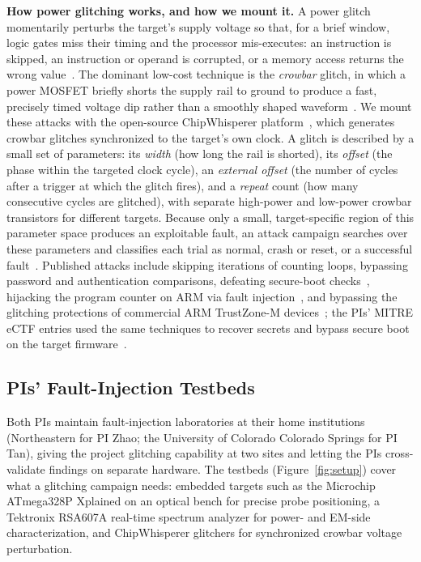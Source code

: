 \noindent\textbf{How power glitching works, and how we mount it.}
A power glitch momentarily perturbs the target's supply voltage so that, for a brief window, logic gates miss their timing and the processor mis-executes: an instruction is skipped, an instruction or operand is corrupted, or a memory access returns the wrong value~\cite{oflynn2016crowbar}.
The dominant low-cost technique is the \emph{crowbar} glitch, in which a power MOSFET briefly shorts the supply rail to ground to produce a fast, precisely timed voltage dip rather than a smoothly shaped waveform~\cite{oflynn2016crowbar}.
We mount these attacks with the open-source ChipWhisperer platform~\cite{chipwhisperer, chipwhispererdocs}, which generates crowbar glitches synchronized to the target's own clock.
A glitch is described by a small set of parameters: its \emph{width} (how long the rail is shorted), its \emph{offset} (the phase within the targeted clock cycle), an \emph{external offset} (the number of cycles after a trigger at which the glitch fires), and a \emph{repeat} count (how many consecutive cycles are glitched), with separate high-power and low-power crowbar transistors for different targets.
Because only a small, target-specific region of this parameter space produces an exploitable fault, an attack campaign searches over these parameters and classifies each trial as normal, crash or reset, or a successful fault~\cite{chipwhispererdocs, carpi2014glitch}.
Published attacks include skipping iterations of counting loops, bypassing password and authentication comparisons, defeating secure-boot checks~\cite{timmers2016bypassing}, hijacking the program counter on ARM via fault injection~\cite{timmers2016controlling}, and bypassing the glitching protections of commercial ARM TrustZone-M devices~\cite{sass2023multi}; the PIs' MITRE eCTF entries used the same techniques to recover secrets and bypass secure boot on the target firmware~\cite{ma2025ectf, ma2026wejust}.

\subsection{PIs' Fault-Injection Testbeds}
\label{sec:testbeds}

Both PIs maintain fault-injection laboratories at their home institutions (Northeastern for PI Zhao; the University of Colorado Colorado Springs for PI Tan), giving the project glitching capability at two sites and letting the PIs cross-validate findings on separate hardware.
The testbeds (Figure~\ref{fig:setup}) cover what a glitching campaign needs: embedded targets such as the Microchip ATmega328P Xplained on an optical bench for precise probe positioning, a Tektronix RSA607A real-time spectrum analyzer for power- and EM-side characterization, and ChipWhisperer glitchers for synchronized crowbar voltage perturbation.

